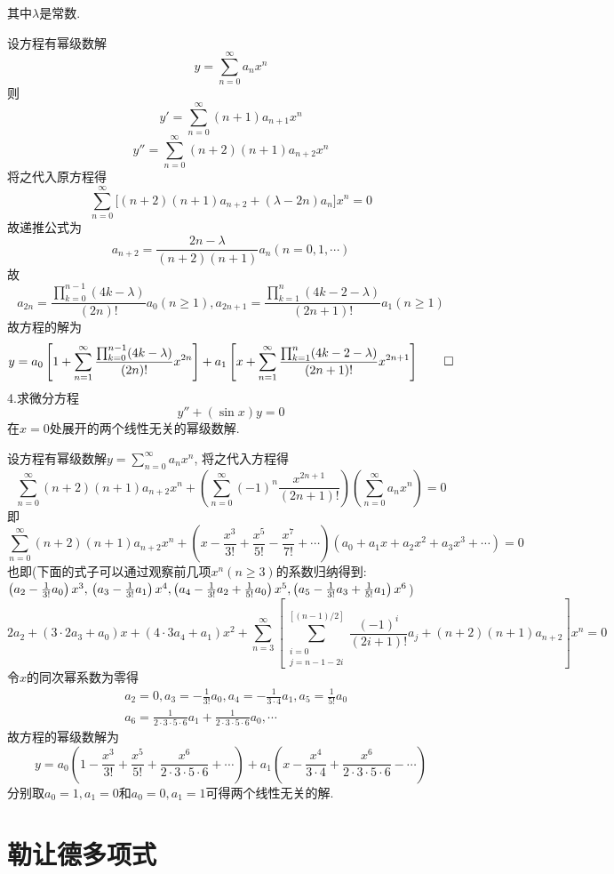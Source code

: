 \documentclass[titlepage,11pt,a4paper,twoside]{report}
\makeatletter
\newenvironment{solve}{\par
	\pushQED{\qed}%
	\normalfont \topsep1\p@\@plus6\p@\relax
	\trivlist
	\item\relax
	{\hspace*{\parindent}{\heiti 解}\@addpunct{:}}\hspace\labelsep\ignorespaces
}{%
	\popQED\endtrivlist\@endpefalse
}
\makeatother
\begin{document}
其中$\lambda$是常数.
\begin{solve} 设方程有幂级数解\[y=\sum_{n=0}^{\infty}a_nx^n\] 则
\[y'=\sum_{n=0}^{\infty}(n+1)a_{n+1}x^n\]
\[y''=\sum_{n=0}^{\infty}(n+2)(n+1)a_{n+2}x^n\]
将之代入原方程得
\[\sum_{n=0}^{\infty}\big[(n+2)(n+1)a_{n+2}+(\lambda-2n)a_n\big]x^n=0\]
故递推公式为
\[a_{n+2}=\frac{2n-\lambda}{(n+2)(n+1)}a_n(n=0,1,\cdots)\]
故\[a_{2n}=\frac{\prod_{k=0}^{n-1}(4k-\lambda)}{(2n)!}a_0(n\geq1),a_{2n+1}=\frac{\prod_{k=1}^n(4k-2-\lambda)}{(2n+1)!}a_1(n\geq1)\]
故方程的解为
\[y=a_0\left[1+\sum_{n=1}^{\infty}\frac{\prod_{k=0}^{n-1}(4k-\lambda)}{(2n)!}x^{2n}\right]+a_1\left[x+\sum_{n=1}^{\infty}\frac{\prod_{k=1}^n(4k-2-\lambda)}{(2n+1)!}x^{2n+1}\right]\qedhere\]
\end{solve}
4.求微分方程\[y''+(\sin x)y=0\]
在$x=0$处展开的两个线性无关的幂级数解.
\begin{solve}
设方程有幂级数解$y=\sum_{n=0}^{\infty}a_nx^n$, 将之代入方程得
\[\sum_{n=0}^{\infty}(n+2)(n+1)a_{n+2}x^n+\left(\sum_{n=0}^{\infty}(-1)^n\frac{x^{2n+1}}{(2n+1)!}\right)\left(\sum_{n=0}^{\infty}a_nx^n\right)=0\]
即
\[\sum_{n=0}^{\infty}(n+2)(n+1)a_{n+2}x^n+\left(x-\frac{x^3}{3!}+\frac{x^5}{5!}-\frac{x^7}{7!}+\cdots\right)\left(a_0+a_1x+a_2x^2+a_3x^3+\cdots\right)=0\]
也即(下面的式子可以通过观察前几项$x^n(n\geq3)$的系数归纳得到: $\left(a_2-\frac{1}{3!}a_0\right)x^3,\\\left(a_3-\frac{1}{3!}a_1\right)x^4,\left(a_4-\frac{1}{3!}a_2+\frac{1}{5!}a_0\right)x^5,\left(a_5-\frac{1}{3!}a_3+\frac{1}{5!}a_1\right)x^6$)
\[2a_2+(3\cdot2a_3+a_0)x+(4\cdot3a_4+a_1)x^2+\sum_{n=3}^{\infty}\left[\sum_{\substack{i=0\\j=n-1-2i}}^{[(n-1)/2]}\frac{(-1)^i}{(2i+1)!}a_j+(n+2)(n+1)a_{n+2}\right]x^n=0\]
令$x$的同次幂系数为零得
\[\begin{split}&a_2=0,a_3=-\frac{1}{3!}a_0,a_4=-\frac{1}{3\cdot4}a_1,a_5=\frac{1}{5!}a_0\\
&a_6=\frac{1}{2\cdot3\cdot5\cdot6}a_1+\frac{1}{2\cdot3\cdot5\cdot6}a_0,\cdots\end{split}\]
故方程的幂级数解为
\[y=a_0\left(1-\frac{x^3}{3!}+\frac{x^5}{5!}+\frac{x^6}{2\cdot3\cdot5\cdot6}+\cdots\right)+a_1\left(x-\frac{x^4}{3\cdot4}+\frac{x^6}{2\cdot3\cdot5\cdot6}-\cdots\right)\]
分别取$a_0=1,a_1=0$和$a_0=0,a_1=1$可得两个线性无关的解.
\end{solve}
\section{勒让德多项式}
\end{document}
